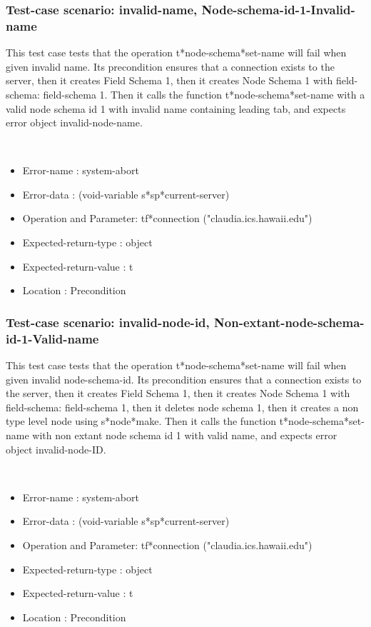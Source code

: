 \subsubsection {Test-case scenario: invalid-name, Node-schema-id-1-Invalid-name}


This test case tests that the operation t*node-schema*set-name will fail when given invalid name.
Its precondition ensures that a connection exists to the server, then it creates Field Schema 1, then it creates Node Schema 1 with field-schema: field-schema 1.
Then it calls the function t*node-schema*set-name  with a valid node schema id 1 with invalid name containing leading tab, and expects error object invalid-node-name.



\
\begin {itemize}
\item 	Error-name             : system-abort
\item Error-data             : (void-variable s*sp*current-server)
\item Operation and Parameter: tf*connection ("claudia.ics.hawaii.edu")
\item Expected-return-type   : object
\item Expected-return-value  : t
\item Location               : Precondition



\end {itemize}
\subsubsection {Test-case scenario: invalid-node-id, Non-extant-node-schema-id-1-Valid-name}


This test case tests that the operation t*node-schema*set-name will fail when given invalid node-schema-id.
Its precondition ensures that a connection exists to the server, then it creates Field Schema 1, then it creates Node Schema 1 with field-schema: field-schema 1, then it deletes node schema 1, then it creates a non type level node using s*node*make.
Then it calls the function t*node-schema*set-name  with non extant node schema id 1 with valid name, and expects error object invalid-node-ID.



\
\begin {itemize}
\item 	Error-name             : system-abort
\item Error-data             : (void-variable s*sp*current-server)
\item Operation and Parameter: tf*connection ("claudia.ics.hawaii.edu")
\item Expected-return-type   : object
\item Expected-return-value  : t
\item Location               : Precondition



\end {itemize}
